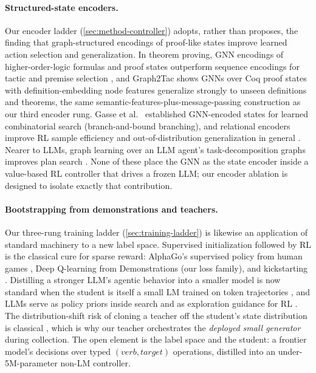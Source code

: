 \paragraph{Structured-state encoders.}
Our encoder ladder (\cref{sec:method-controller}) adopts, rather than
proposes, the finding that graph-structured encodings of proof-like states
improve learned action selection and generalization. In theorem proving,
GNN encodings of higher-order-logic formulas and proof states outperform
sequence encodings for tactic and premise selection
\citep{formulanet, holist, paliwal2020graph}, and Graph2Tac
\citep{graph2tac} shows GNNs over Coq proof states with
definition-embedding node features generalize strongly to unseen
definitions and theorems, the same semantic-features-plus-message-passing
construction as our third encoder rung. Gasse et al.\ \citep{gasse2019}
established GNN-encoded states for learned combinatorial search
(branch-and-bound branching), and relational encoders improve RL sample
efficiency and out-of-distribution generalization in general
\citep{zambaldi2019, battaglia2018}. Nearer to LLMs, graph learning over an
LLM agent's task-decomposition graphs improves plan search
\citep{gnn4taskplan}. None of these place the GNN as the state encoder
inside a value-based RL controller that drives a frozen LLM; our encoder
ablation is designed to isolate exactly that contribution.

\paragraph{Bootstrapping from demonstrations and teachers.}
Our three-rung training ladder (\cref{sec:training-ladder}) is likewise an
application of standard machinery to a new label space. Supervised
initialization followed by RL is the classical cure for sparse reward:
AlphaGo's supervised policy from human games \citep{alphago}, Deep
Q-learning from Demonstrations \citep{dqfd} (our loss family), and
kickstarting \citep{kickstarting}. Distilling a stronger LLM's agentic
behavior into a smaller model is now standard when the student is itself a
small LM trained on token trajectories \citep{fireact, agenttuning}, and
LLMs serve as policy priors inside search \citep{llmmcts} and as exploration
guidance for RL \citep{ellm}. The distribution-shift risk of cloning a
teacher off the student's state distribution is classical \citep{dagger},
which is why our teacher orchestrates the \emph{deployed small generator}
during collection. The open element is the label space and the student: a
frontier model's decisions over typed $(\textit{verb}, \textit{target})$
operations, distilled into an under-5M-parameter non-LM controller.

